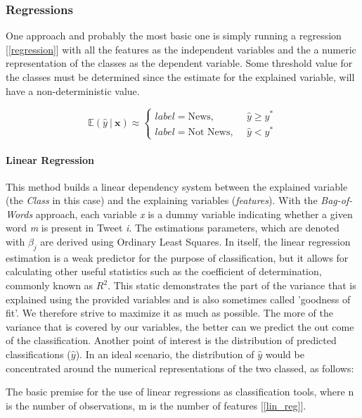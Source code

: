 	\subsubsection{Regressions}
	One approach and probably the most basic one is simply running a regression [\ref{regression}] with all the features as the independent variables and the a numeric representation of the classes as the dependent variable. Some threshold value for the classes must be determined since the estimate for the explained variable, will have a non-deterministic value. 
	
	\begin{equation}
		\mathbb{E}(\hat{y} \ \vert \ \textbf{x}) \approx 
		\begin{cases}
			label = \text{News}, &\hat{y} \geq y^* \\
			label = \text{Not News},\ \ &\hat{y} < y^*
		\end{cases}
		\label{regression}
	\end{equation}
	
	\par
	\paragraph{Linear Regression} 
		This method builds a linear dependency system between the explained variable (the \textit{Class} in this case) and the explaining variables (\textit{features}). With the \textit{Bag-of-Words} approach, each variable \textit{x} is a dummy variable indicating whether a given word \textit{m} is present in Tweet \textit{i}. The estimations parameters, which are denoted with $\beta_j$ are derived using Ordinary Least Squares. In itself, the linear regression estimation is a weak predictor for the purpose of classification, but it allows for calculating other useful statistics such as the coefficient of determination, commonly known as $R^2$. This static demonstrates the part of the variance that is explained using the provided variables and is also sometimes called 'goodness of fit'. We therefore strive to maximize it as much as possible. The more of the variance that is covered by our variables, the better can we predict the out come of the classification. Another point of interest is the distribution of predicted classifications ($\hat{y}$). In an ideal scenario, the distribution of $\hat{y}$ would be concentrated around the numerical representations of the two classed, as follows:
	
	The basic premise for the use of linear regressions as classification tools, where n is the number of observations, m is the number of features [\ref{lin_reg}].
	

